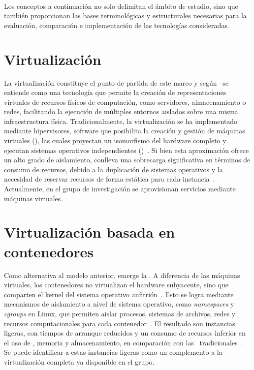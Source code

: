 \label{cap:marcoConceptual}
\mbox{}\\
Los conceptos a continuación no solo delimitan el ámbito de estudio, sino que también proporcionan las bases terminológicas y estructurales necesarias para la evaluación, comparación e implementación de las tecnologías consideradas. 

\section{Virtualización}
\noindent
La virtualización constituye el punto de partida de este marco y según~\citep{AmazonWebServicesInc2023} se entiende como una tecnología que permite la creación de representaciones virtuales de recursos físicos de computación, como servidores, almacenamiento o redes, facilitando la ejecución de múltiples entornos aislados sobre una misma infraestructura física. Tradicionalmente, la virtualización se ha implementado mediante hipervisores, software que posibilita la creación y gestión de máquinas virtuales (\VM), las cuales proyectan un isomorfismo del hardware completo y ejecutan sistemas operativos independientes (\OS)~\citep{KLEIDERMACHER201225}. Si bien esta aproximación ofrece un alto grado de aislamiento, conlleva una sobrecarga significativa en términos de consumo de recursos, debido a la duplicación de sistemas operativos y la necesidad de reservar recursos de forma estática para cada instancia~\citep{bauman2015survey}. Actualmente, en el grupo de investigación se aprovisionan servicios mediante máquinas virtuales.

\section{Virtualización basada en contenedores}
\noindent
Como alternativa al modelo anterior, emerge la \VBC. A diferencia de las máquinas virtuales, los contenedores no virtualizan el hardware subyacente, sino que comparten el kernel del sistema operativo anfitrión~\citep{eder2016hypervisor}. Esto se logra mediante mecanismos de aislamiento a nivel de sistema operativo, como \textit{namespaces} y \textit{cgroups} en Linux, que permiten aislar procesos, sistemas de archivos, redes y recursos computacionales para cada contenedor~\citep{jain2020linux}. El resultado son instancias ligeras, con tiempos de arranque reducidos y un consumo de recursos inferior en el uso de \CPU, memoria y almacenamiento, en comparación con las \VM\ tradicionales~\citep{6903537}. Se puede identificar a estas instancias ligeras como un complemento a la virtualización completa ya disponible en el grupo.


